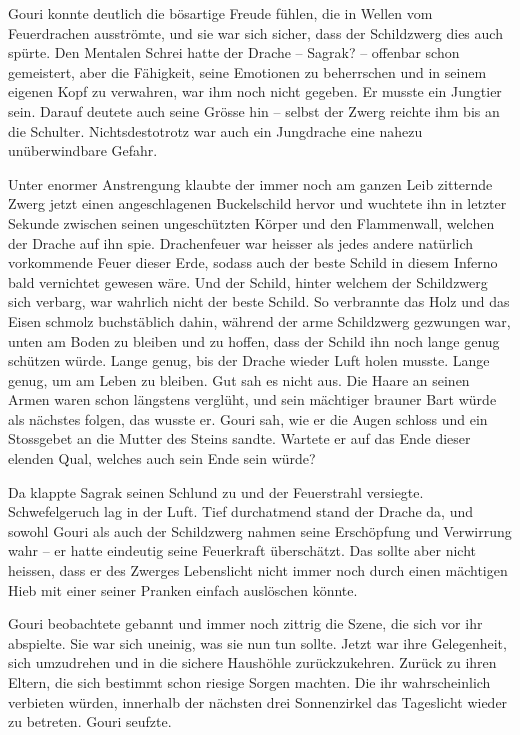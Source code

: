 Gouri konnte deutlich die bösartige Freude fühlen, die in Wellen vom Feuerdrachen ausströmte, und sie war sich sicher, dass der Schildzwerg dies auch spürte. Den Mentalen Schrei hatte der Drache – Sagrak? – offenbar schon gemeistert, aber die Fähigkeit, seine Emotionen zu beherrschen und in seinem eigenen Kopf zu verwahren, war ihm noch nicht gegeben. Er musste ein Jungtier sein. Darauf deutete auch seine Grösse hin – selbst der Zwerg reichte ihm bis an die Schulter. Nichtsdestotrotz war auch ein Jungdrache eine nahezu unüberwindbare Gefahr.

Unter enormer Anstrengung klaubte der immer noch am ganzen Leib zitternde Zwerg jetzt einen angeschlagenen Buckelschild hervor und wuchtete ihn in letzter Sekunde zwischen seinen ungeschützten Körper und den Flammenwall, welchen der Drache auf ihn spie. Drachenfeuer war heisser als jedes andere natürlich vorkommende Feuer dieser Erde, sodass auch der beste Schild in diesem Inferno bald vernichtet gewesen wäre. Und der Schild, hinter welchem der Schildzwerg sich verbarg, war wahrlich nicht der beste Schild. So verbrannte das Holz und das Eisen schmolz buchstäblich dahin, während der arme Schildzwerg gezwungen war, unten am Boden zu bleiben und zu hoffen, dass der Schild ihn noch lange genug schützen würde. Lange genug, bis der Drache wieder Luft holen musste. Lange genug, um am Leben zu bleiben. Gut sah es nicht aus. Die Haare an seinen Armen waren schon längstens verglüht, und sein mächtiger brauner Bart würde als nächstes folgen, das wusste er. Gouri sah, wie er die Augen schloss und ein Stossgebet an die Mutter des Steins sandte. Wartete er auf das Ende dieser elenden Qual, welches auch sein Ende sein würde?

Da klappte Sagrak seinen Schlund zu und der Feuerstrahl versiegte. Schwefelgeruch lag in der Luft. Tief durchatmend stand der Drache da, und sowohl Gouri als auch der Schildzwerg nahmen seine Erschöpfung und Verwirrung wahr – er hatte eindeutig seine Feuerkraft überschätzt. Das sollte aber nicht heissen, dass er des Zwerges Lebenslicht nicht immer noch durch einen mächtigen Hieb mit einer seiner Pranken einfach auslöschen könnte.

Gouri beobachtete gebannt und immer noch zittrig die Szene, die sich vor ihr abspielte. Sie war sich uneinig, was sie nun tun sollte. Jetzt war ihre Gelegenheit, sich umzudrehen und in die sichere Haushöhle zurückzukehren. Zurück zu ihren Eltern, die sich bestimmt schon riesige Sorgen machten. Die ihr wahrscheinlich verbieten würden, innerhalb der nächsten drei Sonnenzirkel das Tageslicht wieder zu betreten. Gouri seufzte.

